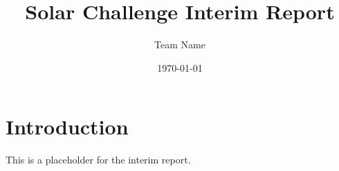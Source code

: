 \documentclass{article}
\begin{document}
\title{Solar Challenge Interim Report}
\author{Team Name}
\date{\today}
\maketitle

\section{Introduction}
This is a placeholder for the interim report.
\end{document}
